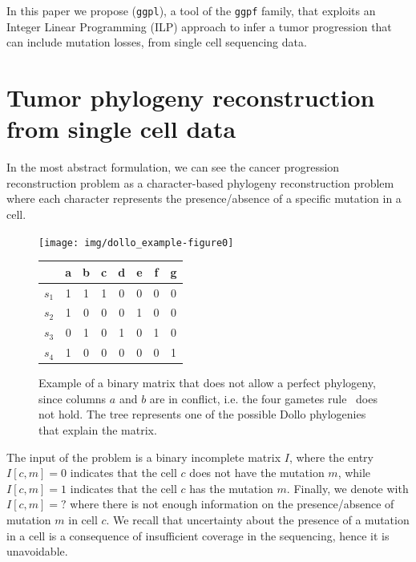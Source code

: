 \documentclass[a4paper,USenglish]{article}
\theoremstyle{definition}
\begin{document}
In this paper we propose (\texttt{ggpl}), a tool of the \texttt{ggpf} family, that
exploits an Integer Linear Programming (ILP) approach to infer a tumor progression that
can include mutation losses, from
single cell sequencing data.

\section{Tumor phylogeny reconstruction from single cell data}

In the most abstract formulation, we can see the cancer progression reconstruction problem
as a
character-based phylogeny reconstruction problem~\cite{Gusfield} where each character
represents  the presence/absence of a specific mutation in a cell.


\begin{figure}[tb!]
  \begin{minipage}[c]{0.55\textwidth}
     \texttt{[image: img/dollo\_example-figure0]}
\end{minipage}
\begin{minipage}[t]{0.3\textwidth}
        \begin{tabular}[!t]{c|ccccccc}
             & a & b & c & d & e & f & g  \\ \hline
            $s_1$ & 1 & 1 & 1 & 0 & 0 & 0 & 0 \\
            $s_2$ & 1 & 0 & 0 & 0 & 1 & 0 & 0 \\
            $s_3$ & 0 & 1 & 0 & 1 & 0 & 1 & 0 \\
            $s_4$ & 1 & 0 & 0 & 0 & 0 & 0 & 1
        \end{tabular}
        \end{minipage}
  \caption{Example of a binary matrix that does not allow a perfect phylogeny, since columns $a$ and $b$ are in conflict, i.e. the four gametes rule~\cite{gusfield1991}
  does not hold. The tree represents one of the possible Dollo phylogenies that explain the matrix.}
\label{fig:dollo}
\end{figure}

The input of the problem is a binary incomplete matrix $I$, where the entry $I[c,m]=0$ indicates
that the cell $c$ does not have the mutation $m$, while $I[c,m]=1$ indicates that the
cell $c$ has the mutation $m$.
Finally, we denote with $I[c,m]=?$ where there is not enough information on the
presence/absence of mutation $m$ in cell $c$. 
We recall that uncertainty about the presence of a mutation in a cell is a consequence of
insufficient coverage in the sequencing, hence it is unavoidable.
\end{document}
